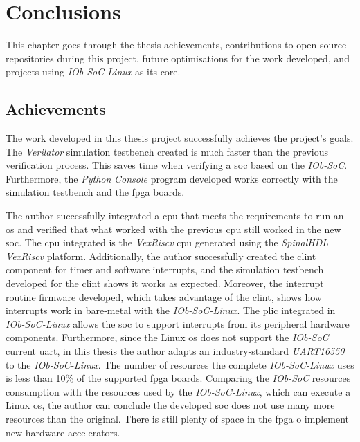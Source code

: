 \chapter{Conclusions}
\label{chapter:conclusions}
This chapter goes through the thesis achievements, contributions to open-source repositories during this project, future optimisations for the work developed, and projects using \textit{IOb-SoC-Linux} as its core.

\section{Achievements}
\label{section:achievements}
The work developed in this thesis project successfully achieves the project's goals. The \textit{Verilator} simulation testbench created is much faster than the previous verification process. This saves time when verifying a \acrshort{soc} based on the \textit{IOb-SoC}. Furthermore, the \textit{Python} \textit{Console} program developed works correctly with the simulation testbench and the \acrshort{fpga} boards.

The author successfully integrated a \acrshort{cpu} that meets the requirements to run an \acrshort{os} and verified that what worked with the previous \acrshort{cpu} still worked in the new \acrshort{soc}. The \acrshort{cpu} integrated is the \textit{VexRiscv} \acrshort{cpu} generated using the \textit{SpinalHDL} \textit{VexRiscv} platform. Additionally, the author successfully created the \acrshort{clint} component for timer and software interrupts, and the simulation testbench developed for the \acrshort{clint} shows it works as expected. Moreover, the interrupt routine firmware developed, which takes advantage of the \acrshort{clint}, shows how interrupts work in bare-metal with the \textit{IOb-SoC-Linux}. The \acrshort{plic} integrated in \textit{IOb-SoC-Linux} allows the \acrshort{soc} to support interrupts from its peripheral hardware components. Furthermore, since the Linux \acrshort{os} does not support the \textit{IOb-SoC} current \acrshort{uart}, in this thesis the author adapts an industry-standard \textit{UART16550} to the \textit{IOb-SoC-Linux}. The number of resources the complete \textit{IOb-SoC-Linux} uses is less than 10\% of the supported \acrshort{fpga} boards. Comparing the \textit{IOb-SoC} resources consumption with the resources used by the \textit{IOb-SoC-Linux}, which can execute a Linux \acrshort{os}, the author can conclude the developed \acrshort{soc} does not use many more resources than the original. There is still plenty of space in the \acrshort{fpga} o implement new hardware accelerators.


